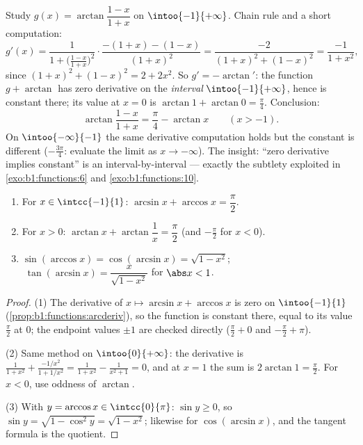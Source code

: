 \begin{example}\label{ex:b1:functions:hiddenconst}
Study $g(x) = \arctan\dfrac{1 - x}{1 + x}$ on $\intoo{-1}
{+\infty}$. Chain rule and a short computation:
\[
g'(x) = \frac{1}{1 + \bigl(\frac{1-x}{1+x}\bigr)^2}\cdot
\frac{-(1+x) - (1-x)}{(1+x)^2}
= \frac{-2}{(1+x)^2 + (1-x)^2}
= \frac{-1}{1 + x^2} ,
\]
since $(1+x)^2 + (1-x)^2 = 2 + 2x^2$. So $g' = -\arctan'$: the
function $g + \arctan$ has zero derivative on the \emph{interval}
$\intoo{-1}{+\infty}$, hence is constant there; its value at $x =
0$ is $\arctan 1 + \arctan 0 = \frac\pi4$. Conclusion:
\[
\arctan\frac{1 - x}{1 + x} = \frac\pi4 - \arctan x
\qquad (x > -1) .
\]
On $\intoo{-\infty}{-1}$ the same derivative computation holds but
the constant is different ($-\frac{3\pi}4$: evaluate the limit as
$x \to -\infty$). The insight: ``zero derivative implies
constant'' is an interval-by-interval  --- exactly the
subtlety exploited in \cref{exo:b1:functions:6} and
\cref{exo:b1:functions:10}.
\end{example}

\begin{proposition}\label{prop:b1:functions:arcidentities}
\begin{enumerate}
  \item For $x \in \intcc{-1}{1}$: $\arcsin x + \arccos x =
        \dfrac{\pi}{2}$.
  \item For $x > 0$: $\arctan x + \arctan\dfrac 1x = \dfrac{\pi}{2}$
        (and $-\frac\pi2$ for $x < 0$).
  \item $\sin(\arccos x) = \cos(\arcsin x) = \sqrt{1 - x^2}$;
        $\;\tan(\arcsin x) = \dfrac{x}{\sqrt{1 - x^2}}$ for
        $\abs x < 1$.
\end{enumerate}
\end{proposition}

\begin{proof}
(1) The derivative of $x \mapsto \arcsin x + \arccos x$ is zero on
$\intoo{-1}{1}$ (\cref{prop:b1:functions:arcderiv}), so the function
is constant there, equal to its value $\frac\pi2$ at $0$; the endpoint
values $\pm 1$ are checked directly ($\frac\pi2 + 0$ and $-\frac\pi2 +
\pi$).

(2) Same method on $\intoo{0}{+\infty}$: the derivative is
$\frac{1}{1+x^2} + \frac{-1/x^2}{1 + 1/x^2} = \frac{1}{1+x^2} -
\frac{1}{x^2 + 1} = 0$, and at $x = 1$ the sum is $2\arctan 1 =
\frac\pi2$. For $x < 0$, use oddness of $\arctan$.

(3) With $y = \arccos x \in \intcc{0}{\pi}$: $\sin y \geq 0$, so
$\sin y = \sqrt{1 - \cos^2 y} = \sqrt{1 - x^2}$; likewise for
$\cos(\arcsin x)$, and the tangent formula is the quotient.
\end{proof}


